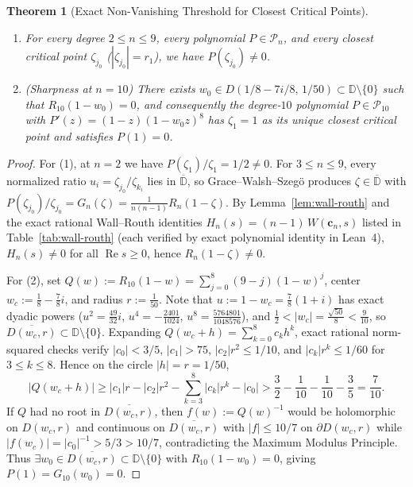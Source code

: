 \documentclass[11pt,a4paper]{article}
\newtheorem{theorem}{Theorem}[section]
\theoremstyle{definition}
\theoremstyle{remark}
\newcommand{\DD}{\mathbb{D}}
\DeclareMathOperator{\RePart}{Re}
\begin{document}
\begin{theorem}[Exact Non-Vanishing Threshold for Closest Critical Points]
\label{thm:nonvanishing-threshold}
\leavevmode
\begin{enumerate}
\item For every degree $2 \le n \le 9$, every polynomial $P \in \mathcal{P}_n$, and every closest critical point $\zeta_{j_0}$ ($|\zeta_{j_0}| = r_1$), we have $P(\zeta_{j_0}) \neq 0$.
\item \emph{(Sharpness at $n = 10$)} There exists $w_0 \in D(1/8 - 7i/8,\, 1/50) \subset \DD \setminus \{0\}$ such that $R_{10}(1 - w_0) = 0$, and consequently the degree-$10$ polynomial $P \in \mathcal{P}_{10}$ with $P'(z) = (1 - z)(1 - w_0 z)^8$ has $\zeta_1 = 1$ as its unique closest critical point and satisfies $P(1) = 0$.
\end{enumerate}
\end{theorem}

\begin{proof}
For (1), at $n = 2$ we have $P(\zeta_1)/\zeta_1 = 1/2 \neq 0$. For $3 \le n \le 9$, every normalized ratio $u_i = \zeta_{j_0}/\zeta_{k_i}$ lies in $\overline{\DD}$, so Grace--Walsh--Szeg\"o produces $\zeta \in \overline{\DD}$ with $P(\zeta_{j_0})/\zeta_{j_0} = G_n(\zeta) = \frac{1}{n(n-1)} R_n(1 - \zeta)$. By Lemma~\ref{lem:wall-routh} and the exact rational Wall--Routh identities $H_n(s) = (n - 1)\, W(\mathbf{c}_n, s)$ listed in Table~\ref{tab:wall-routh} (each verified by exact polynomial identity in Lean~4), $H_n(s) \neq 0$ for all $\RePart s \ge 0$, hence $R_n(1 - \zeta) \neq 0$.

For (2), set $Q(w) := R_{10}(1 - w) = \sum_{j=0}^8 (9 - j)(1 - w)^j$, center $w_c := \frac{1}{8} - \frac{7}{8} i$, and radius $r := \frac{1}{50}$. Note that $u := 1 - w_c = \frac{7}{8}(1 + i)$ has exact dyadic powers ($u^2 = \frac{49}{32} i$, $u^4 = -\frac{2401}{1024}$, $u^8 = \frac{5764801}{1048576}$), and $\frac{1}{2} < |w_c| = \frac{\sqrt{50}}{8} < \frac{9}{10}$, so $\overline{D(w_c, r)} \subset \DD \setminus \{0\}$. Expanding $Q(w_c + h) = \sum_{k=0}^8 c_k h^k$, exact rational norm-squared checks verify $|c_0| < 3/5$, $|c_1| > 75$, $|c_2| r^2 \le 1/10$, and $|c_k| r^k \le 1/60$ for $3 \le k \le 8$. Hence on the circle $|h| = r = 1/50$,
\[
|Q(w_c + h)| \ge |c_1| r - |c_2| r^2 - \sum_{k=3}^8 |c_k| r^k - |c_0| > \frac{3}{2} - \frac{1}{10} - \frac{1}{10} - \frac{3}{5} = \frac{7}{10}.
\]
If $Q$ had no root in $\overline{D(w_c, r)}$, then $f(w) := Q(w)^{-1}$ would be holomorphic on $D(w_c, r)$ and continuous on $\overline{D(w_c, r)}$ with $|f| \le 10/7$ on $\partial D(w_c, r)$ while $|f(w_c)| = |c_0|^{-1} > 5/3 > 10/7$, contradicting the Maximum Modulus Principle. Thus $\exists w_0 \in \overline{D(w_c, r)} \subset \DD \setminus \{0\}$ with $R_{10}(1 - w_0) = 0$, giving $P(1) = G_{10}(w_0) = 0$.
\end{proof}
\end{document}
